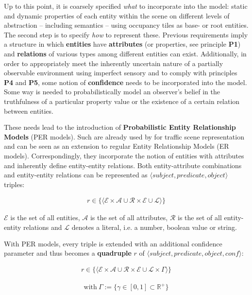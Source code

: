 Up to this point, it is coarsely specified \textit{what} to incorporate into the model: static and dynamic properties of each entity within the scene on different levels of abstraction – including semantics – using occupancy tiles as base- or root entities. The second step is to specify \textit{how} to represent these. Previous requirements imply a structure in which \textbf{entities} have \textbf{attributes} (or properties, see principle \textbf{P1}) and \textbf{relations} of various types among different entities can exist. Additionally, in order to appropriately meet the inherently uncertain nature of a partially observable environment using imperfect sensory and to comply with principles \textbf{P4} and \textbf{P5}, some notion of \textbf{confidence} needs to be incorporated into the model. Some way is needed to probabilistically model an observer's belief in the truthfulness of a particular property value or the existence of a certain relation between entities. 

These needs lead to the introduction of \textbf{Probabilistic Entity Relationship Models} (PER models). Such are already used by \cite{Petrich2018} for traffic scene representation and can be seen as an extension to regular Entity Relationship Models (ER models). Correspondingly, they incorporate the notion of entities with attributes and inherently define entity-entity relations. Both entity-attribute combinations and entity-entity relations can be represented as $\langle subject, predicate, object \rangle$ triples:

\begin{gather}
	r \in \{ \langle \mathcal{E} \times \mathcal{A} \cup \mathcal{R} \times \mathcal{E} \cup \mathcal{L} \rangle \}
\end{gather}
\label{eq:triples}

$\mathcal{E}$ is the set of all entities, $\mathcal{A}$ is the set of all attributes, $\mathcal{R}$ is the set of all entity-entity relations and $\mathcal{L}$ denotes a literal, i.e. a number, boolean value or string.

With PER models, every triple is extended with an additional confidence parameter and thus becomes a \textbf{quadruple} $r$ of $\langle subject, predicate, object, \textit{conf} \rangle$: 

\begin{samepage}
	\begin{gather}
	r \in \{ \langle \mathcal{E} \times \mathcal{A} \cup \mathcal{R} \times \mathcal{E} \cup \mathcal{L} \times \Gamma \rangle \}
	\end{gather}
	\label{eq:quadruples}
	
	\vspace{-10ex}
	
	\begin{gather*}
	\text{with} \  \Gamma := \{ \gamma \in [0, 1] \subset \mathbb{R}^+ \}
	\end{gather*}
\end{samepage}

